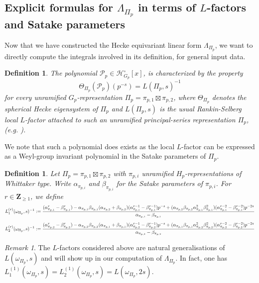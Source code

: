 \documentclass{amsart}%
\theoremstyle{plain}
\newcommand\scalemath[2]{\scalebox{#1}{\mbox{\ensuremath{\displaystyle #2}}}}
\theoremstyle{plain}
\newtheorem{defn}[thm]{Definition}
\theoremstyle{remark}
\newtheorem{rem}[thm]{Remark}
\begin{document}
\subsection{Explicit formulas for $\Lambda_{\Pi_p}$ in terms of $L$-factors and Satake parameters}\label{sec explicit formulae} Now that we have constructed the Hecke equivariant linear form $\Lambda_{\Pi_p}$, we want to directly compute the integrals involved in its definition, for general input data.
 \begin{defn}\label{def Euler polynomial factor}
The polynomial $\mathcal{P}_p\in\mathcal{H}_{G_p}^\circ[x]$, is characterized by the property 
    $$\Theta_{\Pi_p}(\mathcal{P}_p)(p^{-s})=L(\Pi_p,s)^{-1}$$
    for every unramified $G_p$-representation $\Pi_p=\pi_{p,1}\boxtimes \pi_{p,2}$,
    where $\Theta_{\Pi_p}$ denotes the spherical Hecke eigensystem of $\Pi_p$ and $L(\Pi_p,s)$ is the usual Rankin-Selberg local $L$-factor attached to such an unramified principal-series representation $\Pi_p$, (e.g. \cite{Jacquet1972GL2Part2}).
\end{defn}
\noindent We note that such a polynomial does exists as the local $L$-factor can be expressed as a Weyl-group invariant polynomial in the Satake parameters of $\Pi_p$.


\begin{defn} \label{def generalized L factors}
    Let $\Pi_p=\pi_{p,1}\boxtimes \pi_{p,2}$ with $\pi_{p,i}$ unramified $H_p$-representations of Whittaker type. Write $\alpha_{\pi_{p,i}}$ and $\beta_{\pi_{p,i}}$ for the Satake parameters of $\pi_{p,i}$. For $r\in\mathbf{Z}_{\geq 1}$, we define
    \begin{align*}
       \scalemath{0.9}{ L_1^{(r)}(\omega_{\Pi_p},s)^{-1}:=\frac{(\alpha_{\pi_{p,1}}^r-\beta_{\pi_{p,1}}^r)-\alpha_{\pi_{p,1}}\beta_{\pi_{p,1}}(\alpha_{\pi_{p,2}}+\beta_{\pi_{p,2}})(\alpha_{\pi_{p,1}}^{r-1}-\beta_{\pi_{p,1}}^{r-1})p^{-s}+(\alpha_{\pi_{p,2}}\beta_{\pi_{p,2}}\alpha_{\pi_{p,1}}^2\beta_{\pi_{p,1}}^2)(\alpha_{\pi_{p,1}}^{r-2}-\beta_{\pi_{p,1}}^{r-2})p^{-2s}}{\alpha_{\pi_{p,1}}-\beta_{\pi_{p,1}}}}
    \end{align*}
    \begin{align*}
       \scalemath{0.9}{ L_2^{(r)}(\omega_{\Pi_p},s)^{-1}:=\frac{(\alpha_{\pi_{p,2}}^r-\beta_{\pi_{p,2}}^r)-\alpha_{\pi_{p,2}}\beta_{\pi_{p,2}}(\alpha_{\pi_{p,1}}+\beta_{\pi_{p,1}})(\alpha_{\pi_{p,2}}^{r-1}-\beta_{\pi_{p,2}}^{r-1})p^{-s}+(\alpha_{\pi_{p,1}}\beta_{\pi_{p,1}}\alpha_{\pi_{p,2}}^2\beta_{\pi_{p,2}}^2)(\alpha_{\pi_{p,2}}^{r-2}-\beta_{\pi_{p,2}}^{r-2})p^{-2s}}{\alpha_{\pi_{p,2}}-\beta_{\pi_{p,2}}}}
    \end{align*}
\end{defn}
\begin{rem}\label{rem :4.3.4}
    The $L$-factors considered above are natural generalisations of $L(\omega_{\Pi_p},s)$ and will show up in our computation of $\Lambda_{\Pi_p}$. In fact, one has $L_1^{(1)}(\omega_{\Pi_p},s)=L_2^{(1)}(\omega_{\Pi_p},s)=L(\omega_{\Pi_p},2s)$.
\end{rem}
\end{document}
